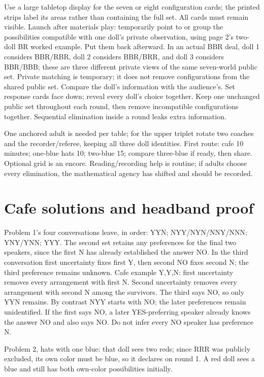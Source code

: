\documentclass[11pt,letterpaper]{article}
\begin{document}
Use a large tabletop display for the seven or eight configuration cards; the printed strips label its areas rather than containing the full set. All cards must remain visible. Launch after materials play: temporarily point to or group the possibilities compatible with one doll's private observation, using page 2's two-doll BR worked example. Put them back afterward. In an actual BBR deal, doll 1 considers BBR/RBR, doll 2 considers BBR/BRR, and doll 3 considers BBR/BBB; these are three different private views of the same seven-world public set. Private matching is temporary; it does not remove configurations from the shared public set. Compare the doll's information with the audience's. Set response cards face down; reveal every doll's choice together. Keep one unchanged public set throughout each round, then remove incompatible configurations together. Sequential elimination inside a round leaks extra information.

One anchored adult is needed per table; for the upper triplet rotate two coaches and the recorder/referee, keeping all three doll identities. First route: cafe 10 minutes; one-blue hats 10; two-blue 15; compare three-blue if ready, then share. Optional grid is an encore. Reading/recording help is routine; if adults choose every elimination, the mathematical agency has shifted and should be recorded.
\newpage
\section*{Cafe solutions and headband proof}
Problem 1's four conversations leave, in order: YYN; NYY/NYN/NNY/NNN; YNY/YNN; YYY. The second set retains any preferences for the final two speakers, since the first N has already established the answer NO. In the third conversation first uncertainty fixes first Y, then second NO fixes second N; the third preference remains unknown. Cafe example Y,Y,N: first uncertainty removes every arrangement with first N. Second uncertainty removes every arrangement with second N among the survivors. The third says NO, so only YYN remains. By contrast NYY starts with NO; the later preferences remain unidentified. If the first says NO, a later YES-preferring speaker already knows the answer NO and also says NO. Do not infer every NO speaker has preference N.

Problem 2, hats with one blue: that doll sees two reds; since RRR was publicly excluded, its own color must be blue, so it declares on round 1. A red doll sees a blue and still has both own-color possibilities initially.
\end{document}
